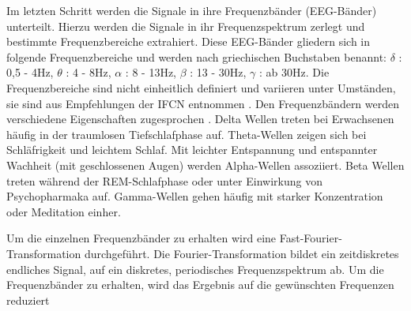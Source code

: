 Im letzten Schritt werden die Signale in ihre Frequenzbänder (EEG-Bänder) unterteilt. Hierzu werden die Signale in ihr Frequenzspektrum zerlegt und bestimmte Frequenzbereiche extrahiert. Diese EEG-Bänder gliedern sich in folgende Frequenzbereiche und werden nach griechischen Buchstaben benannt: $\delta$ : 0,5 - 4Hz, $\theta$ : 4 - 8Hz, $\alpha$ : 8 - 13Hz, $\beta$ : 13 - 30Hz, $\gamma$ : ab 30Hz. Die Frequenzbereiche sind nicht einheitlich definiert und variieren unter Umständen, sie sind aus Empfehlungen der IFCN entnommen \cite{ifcn}. Den Frequenzbändern werden verschiedene Eigenschaften zugesprochen \cite{lei2011,Lv2010,Gundel1992}. Delta Wellen treten bei Erwachsenen häufig in der traumlosen Tiefschlafphase auf. Theta-Wellen zeigen sich bei Schläfrigkeit und leichtem Schlaf. Mit leichter Entspannung und entspannter Wachheit (mit geschlossenen Augen) werden Alpha-Wellen assoziiert. Beta Wellen treten während der REM-Schlafphase oder unter Einwirkung von Psychopharmaka auf. Gamma-Wellen gehen häufig mit starker Konzentration oder Meditation einher.

Um die einzelnen Frequenzbänder zu erhalten wird eine Fast-Fourier-Transformation \cite{Bochner_1} durchgeführt. \wavelet
Die Fourier-Transformation bildet ein zeitdiskretes endliches Signal, auf ein diskretes, periodisches Frequenzspektrum ab. Um die Frequenzbänder zu erhalten, wird das Ergebnis auf die gewünschten Frequenzen reduziert\fftExample
